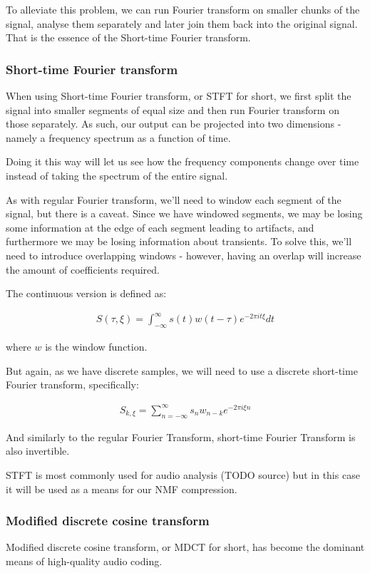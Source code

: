 To alleviate this problem, we can run Fourier transform on smaller chunks of the signal, analyse them separately and later join them back into the original signal. That is the essence of the Short-time Fourier transform.

\subsubsection{Short-time Fourier transform}
When using Short-time Fourier transform, or STFT for short, we first split the signal into smaller segments of equal size and then run Fourier transform on those separately. As such, our output can be projected into two dimensions - namely a frequency spectrum as a function of time.

Doing it this way will let us see how the frequency components change over time instead of taking the spectrum of the entire signal.

As with regular Fourier transform, we'll need to window each segment of the signal, but there is a caveat. Since we have windowed segments, we may be losing some information at the edge of each segment leading to artifacts, and furthermore we may be losing information about transients. To solve this, we'll need to introduce overlapping windows - however, having an overlap will increase the amount of coefficients required.

The continuous version is defined as: \cite{Recoskie2014ConstrainedNM}

\begin{align}
S(\tau, \xi) = \int_{-\infty}^{\infty}s(t)w(t-\tau)e^{-2\pi it\xi}dt
\end{align}

where $w$ is the window function.

But again, as we have discrete samples, we will need to use a discrete short-time Fourier transform, specifically:

\begin{align}
S_{k, \xi} = \sum_{n=-\infty}^{\infty}s_nw_{n-k}e^{-2\pi i\xi n}
\end{align}

And similarly to the regular Fourier Transform, short-time Fourier Transform is also invertible. \cite{selesnick_2009}

STFT is most commonly used for audio analysis (TODO source) but in this case it will be used as a means for our NMF compression.

\subsubsection{Modified discrete cosine transform}
Modified discrete cosine transform, or MDCT for short, has become the dominant means of high-quality audio coding. \cite{wang_vilermo_2012_mdct}

